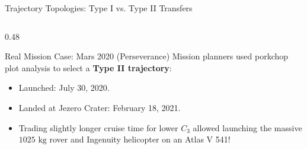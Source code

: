 \documentclass[aspectratio=169, 10pt]{beamer}
\begin{document}
\begin{frame}{Trajectory Topologies: Type I vs. Type II Transfers}
\begin{columns}[t]
        \begin{column}{0.48\textwidth}
            \begin{exampleblock}{Real Mission Case: Mars 2020 (Perseverance)}
                \scriptsize
                Mission planners used porkchop plot analysis to select a \textbf{Type II trajectory}:
                \begin{itemize}\setlength{\itemsep}{1pt}
                    \item Launched: July 30, 2020.
                    \item Landed at Jezero Crater: February 18, 2021.
                    \item Trading slightly longer cruise time for lower $C_3$ allowed launching the massive $1025\text{ kg}$ rover and Ingenuity helicopter on an Atlas V 541!
                \end{itemize}
            \end{exampleblock}
        \end{column}
    \end{columns}
\end{frame}
\end{document}
